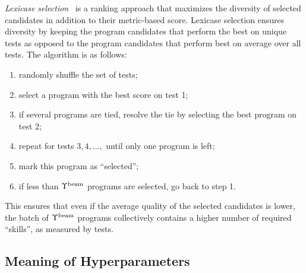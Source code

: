 \emph{Lexicase selection}~\cite{helmuth2015:solving} is a ranking approach that maximizes the diversity of selected candidates in addition to their metric-based score.
Lexicase selection ensures diversity by keeping the program candidates that perform the best on unique tests as opposed to the program candidates that perform best on average over all tests.
The algorithm is as follows:
\begin{enumerate}

\setlength{\parskip}{0pt}
\setlength\itemsep{0pt}

    \item randomly shuffle the set of tests;
    \item select a program with the best score on test 1;
    \item if several programs are tied, resolve the tie by selecting the best program on test 2;
    \item repeat for tests $3,4,\dots,$ until only one program is left;
    \item mark this program as ``selected'';
    \item if less than $\Upsilon^\text{beam}$ programs are selected, go back to step 1.
\end{enumerate}
This ensures that even if the average quality of the selected candidates is lower, the batch of $\Upsilon^\text{beam}{}$ programs collectively contains a higher number of required ``skills'', as measured by tests.



\newpage\subsection{Meaning of Hyperparameters}
\label{sec:seidr-beam-search}

